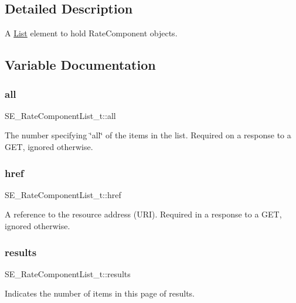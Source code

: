 \subsection{Detailed Description}
A \hyperlink{structList}{List} element to hold Rate\+Component objects. 

\subsection{Variable Documentation}
\mbox{\label{group__RateComponentList_ga66c86683c6d297588ba72f872df21ac8}} 
\subsubsection{\texorpdfstring{all}{all}}
{\footnotesize\ttfamily S\+E\+\_\+\+Rate\+Component\+List\+\_\+t\+::all}

The number specifying \char`\"{}all\char`\"{} of the items in the list. Required on a response to a G\+ET, ignored otherwise. \mbox{\label{group__RateComponentList_gaa83df8a31bf912815dbe0a1a6d413325}} 
\subsubsection{\texorpdfstring{href}{href}}
{\footnotesize\ttfamily S\+E\+\_\+\+Rate\+Component\+List\+\_\+t\+::href}

A reference to the resource address (U\+RI). Required in a response to a G\+ET, ignored otherwise. \mbox{\label{group__RateComponentList_ga8ca19d62c82aab6c64c1237662b916dc}} 
\subsubsection{\texorpdfstring{results}{results}}
{\footnotesize\ttfamily S\+E\+\_\+\+Rate\+Component\+List\+\_\+t\+::results}

Indicates the number of items in this page of results. 